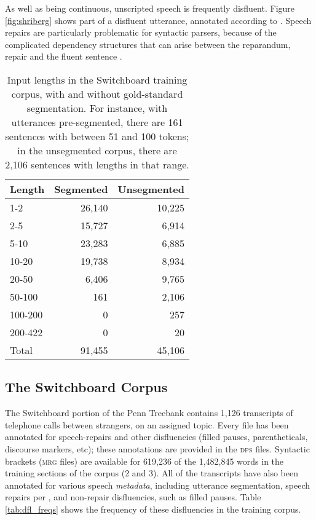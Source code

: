 \documentclass[11pt,letterpaper]{article}
\begin{document}
As well as being continuous, unscripted speech is frequently disfluent.
Figure \ref{fig:shriberg} shows part of a disfluent utterance, annotated according to
\citet{shriberg:94}.
Speech repairs are particularly problematic for syntactic
parsers, because of the complicated dependency structures that can arise between the
reparandum, repair and the fluent sentence \citep{Johnson04a}.

\begin{table}
\centering
\small
\begin{tabular}{l|rr}
    \hline
    Length & Segmented & Unsegmented \\
    \hline \hline
    1-2 & 26,140 & 10,225 \\
    2-5 & 15,727 & 6,914 \\
    5-10 & 23,283 & 6,885 \\
    10-20 & 19,738 &  8,934 \\
    20-50 & 6,406 & 9,765 \\
    50-100 & 161 & 2,106 \\
    100-200 & 0 & 257 \\
    200-422 & 0 & 20 \\
    \hline
    Total & 91,455 & 45,106 \\
    \hline
\end{tabular}
\caption{\small Input lengths in the Switchboard training corpus, with and without
    gold-standard segmentation.  For instance, with utterances pre-segmented,
    there are 161 sentences with between 51 and 100 tokens; in the unsegmented
corpus, there are 2,106 sentences with lengths in that range.
\label{tab:seg_freqs}}
\end{table}

\newpage
\subsection{The Switchboard Corpus}
\label{sec:swbd}

The Switchboard portion of the Penn Treebank \citep{marcus:93} contains 1,126
transcripts of telephone calls between strangers, on an assigned topic.
Every file has been annotated for speech-repairs and other disfluencies (filled
pauses, parentheticals, discourse markers, etc); these annotations are provided
in the \textsc{dps} files.  Syntactic brackets (\textsc{mrg} files) are available
for 619,236 of the 1,482,845 words in the training sections of the corpus (2 and 3). 
All of the transcripts have also been annotated for various speech \emph{metadata},
including utterance segmentation, speech repairs per \citet{shriberg:94}, and 
non-repair disfluencies, such as filled pauses.  Table \ref{tab:dfl_freqs} shows the
frequency of these disfluencies in the training corpus.
\end{document}
